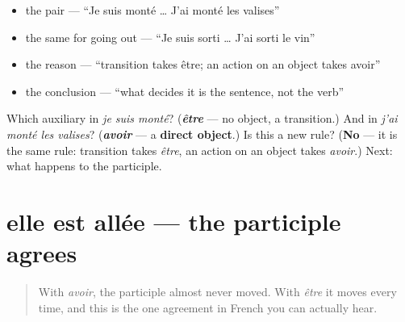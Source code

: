 \begin{itemize}
\raggedright
  \item the pair — \textquotedblleft{}Je suis monté … J'ai monté les valises\textquotedblright{}
  \item the same for going out — \textquotedblleft{}Je suis sorti … J'ai sorti le vin\textquotedblright{}
  \item the reason — \textquotedblleft{}transition takes être; an action on an object takes avoir\textquotedblright{}
  \item the conclusion — \textquotedblleft{}what decides it is the sentence, not the verb\textquotedblright{}
\end{itemize}

\begin{tcolorbox}[breakable,colback=teal!4,colframe=teal!35!black,title={Before you move on}]
Which auxiliary in \emph{je suis monté}? (\emph{\textbf{être}} — no object, a transition.) And in \emph{j'ai monté les valises}? (\emph{\textbf{avoir}} — a \textbf{direct object}.) Is this a new rule? (\textbf{No} — it is the same rule: transition takes \emph{être}, an action on an object takes \emph{avoir}.) Next: what happens to the participle.
\end{tcolorbox}
\section[elle est allée]{elle est allée — the participle agrees}

\label{lesson:FR-C16-accord-sujet}



\begin{quote}
With \emph{avoir}, the participle almost never moved. With \emph{être} it moves every time, and this is the one agreement in French you can actually hear.
\end{quote}

